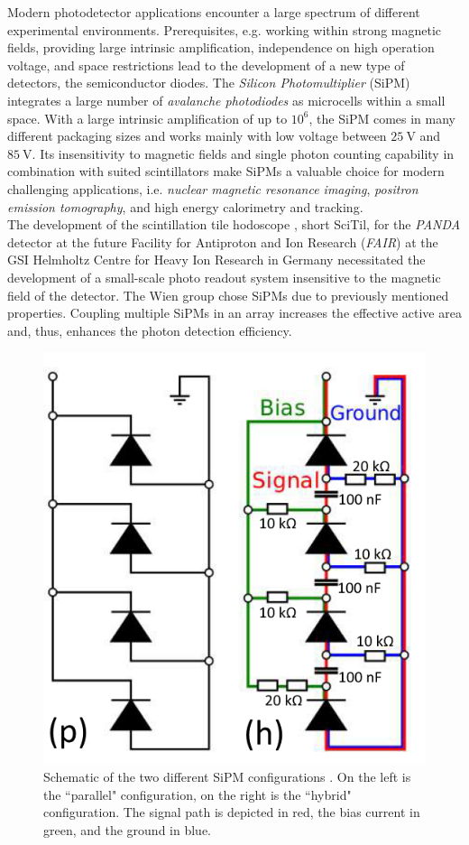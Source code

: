 \documentclass[%
 reprint,
 amsmath,amssymb,
 aps,
]{revtex4-1}
\newcommand{\tit}[1]{\textit{#1}}
\begin{document}
Modern photodetector applications encounter a large spectrum of different experimental environments. Prerequisites, e.g. working within strong magnetic fields, providing large intrinsic amplification, independence on high operation voltage, and space restrictions lead to the development of a new type of detectors, the semiconductor diodes. The \tit{Silicon Photomultiplier} (SiPM) integrates a large number of \tit{avalanche photodiodes} as microcells within a small space. With a large intrinsic amplification of up to $10^6$, the SiPM comes in many different packaging sizes and works mainly with low voltage between $\SI{25}{\volt}$ and $\SI{85}{\volt}$. Its insensitivity to magnetic fields and single photon counting capability in combination with suited scintillators make SiPMs a valuable choice for modern challenging applications, i.e. \tit{nuclear magnetic resonance imaging}, \tit{positron emission tomography}, and high energy calorimetry and tracking. \\ \indent
The development of the scintillation tile hodoscope \cite{SciTil}, short SciTil, for the \tit{PANDA} detector at the future Facility for Antiproton and Ion Research (\tit{FAIR}) at the GSI Helmholtz Centre for Heavy Ion Research in Germany \cite{FAIR} necessitated the development of a small-scale photo readout system insensitive to the magnetic field of the detector. The Wien group chose SiPMs due to previously mentioned properties. Coupling multiple SiPMs in an array increases the effective active area and, thus, enhances the photon detection efficiency. \\ \indent
\begin{figure}[b!]
	\includegraphics[width=0.5\linewidth]{./graphics/ch4/circuits.PNG}
	\caption{ Schematic of the two different SiPM configurations \cite{sebastian}. On the left is the ``parallel" configuration, on the right is the ``hybrid" configuration. The signal path is depicted in red, the bias current in green, and the ground in blue.  }
	\label{fig:PCB}
\end{figure}
\end{document}
